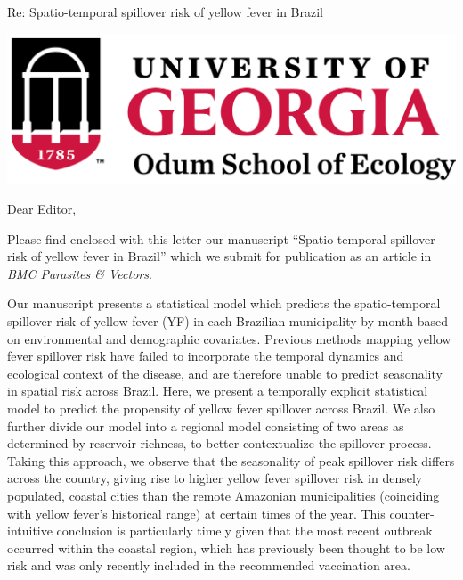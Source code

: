 \documentclass{letter}
\begin{document}
 
\begin{letter} {Re:  Spatio-temporal spillover risk of yellow fever in Brazil} %

\includegraphics[width=\textwidth]{newlogo.png}




\opening{Dear Editor, }

Please find enclosed with this letter our manuscript ``Spatio-temporal spillover risk of yellow fever in Brazil'' which we submit for publication as an article in \textit{BMC Parasites \& Vectors}. 

Our manuscript presents a statistical model which predicts the spatio-temporal spillover risk of yellow fever (YF) in each Brazilian municipality by month based on environmental and demographic covariates. Previous methods mapping yellow fever spillover risk have failed to incorporate the temporal dynamics and ecological context of the disease, and are therefore unable to predict seasonality in spatial risk across Brazil. Here, we present a temporally explicit statistical model to predict the propensity of yellow fever spillover across Brazil. We also further divide our model into a regional model consisting of two areas as determined by reservoir richness, to better contextualize the spillover process. Taking this approach, we observe that the seasonality of peak spillover risk differs across the country, giving rise to higher yellow fever spillover risk in densely populated, coastal cities than the remote Amazonian municipalities (coinciding with yellow fever's historical range) at certain times of the year. This counter-intuitive conclusion is particularly timely given that the most recent outbreak occurred within the coastal region, which has previously been thought to be low risk and was only recently included in the recommended vaccination area. 


\end{letter}
\end{document}
